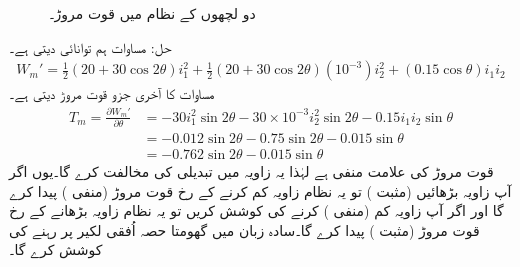 \begin{figure}
\caption{دو لچھوں کے نظام میں قوت مروڑ۔}
\label{شکل_تبادلہ_توانائی_دو_لچھوں_میں_مروڑ}
\end{figure}

حل:\quad
مساوات  ہم توانائی دیتی ہے۔
\begin{align*}
W_m'=\frac{1}{2}(20+30\cos 2\theta)i_1^2+\frac{1}{2}(20+30\cos 2\theta)(10^{-3})i_2^2+(0.15\cos\theta)i_1i_2
\end{align*}
مساوات   کا آخری جزو قوت مروڑ دیتی ہے۔
\begin{align*}
T_m=\frac{\partial W_m'}{\partial \theta}&=-30 i_1^2 \sin 2 \theta-30\times 10^{-3} i_2^2 \sin 2 \theta -0.15 i_1 i_2 \sin \theta\\
&=-0.012 \sin 2 \theta-0.75 \sin 2 \theta-0.015 \sin \theta\\
&=-0.762 \sin 2 \theta-0.015 \sin \theta
\end{align*}
قوت مروڑ کی علامت منفی ہے لہٰذا یہ زاویہ میں تبدیلی کی مخالفت کرے گا۔یوں اگر آپ زاویہ بڑھائیں (مثبت ) تو یہ نظام زاویہ کم کرنے کے رخ قوت مروڑ (منفی ) پیدا کرے گا اور اگر آپ زاویہ کم (منفی ) کرنے کی کوشش کریں تو یہ نظام  زاویہ بڑھانے کے رخ قوت مروڑ (مثبت ) پیدا کرے گا۔سادہ زبان میں گھومتا حصہ اُفقی لکیر پر رہنے کی کوشش کرے گا۔
